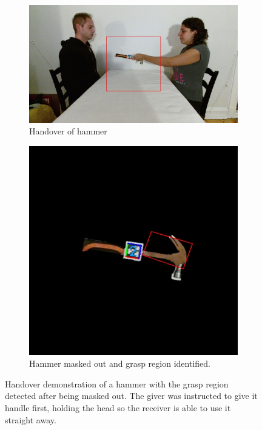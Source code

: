 \begin{figure}
	\centering
	\begin{subfigure}[b]{\textwidth}
		\centering
		\includegraphics[width=\textwidth]{img/methods/handovers/hammer_frame.jpg}
		\caption{Handover of hammer}
		\label{fig:demo_handover_hammer}
	\end{subfigure}
	\par\bigskip
	\begin{subfigure}[b]{0.5\textwidth}
		\centering
		\includegraphics[width=\textwidth]{img/methods/handovers/hammer_masked.jpg}
		\caption{Hammer masked out and grasp region identified.}
		\label{fig:handover_hammer_masked}
	\end{subfigure}
	\caption{Handover demonstration of a hammer with the grasp region detected after being masked out. The giver was instructed to give it handle first, holding the head so the receiver is able to use it straight away.}
	\label{fig:handover_hammer}
\end{figure}

